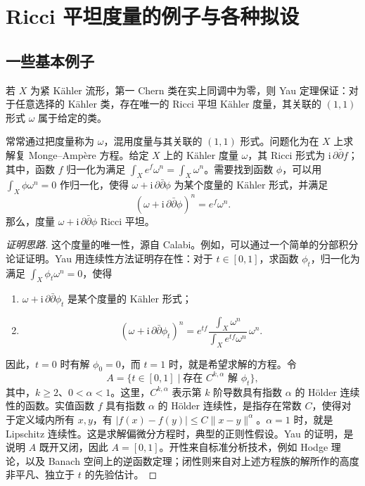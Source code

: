 \section{Ricci 平坦度量的例子与各种拟设}\label{sec:7.1}

\subsection{一些基本例子}\label{sec:7.1.1}

\begin{theorem*}[Yau 定理]
若 $X$ 为紧 Kähler 流形，第一 Chern 类在实上同调中为零，则 Yau 定理保证：对于任意选择的 Kähler 类，存在唯一的 Ricci 平坦 Kähler 度量，其关联的 $(1,1)$ 形式 $\omega$ 属于给定的类。
\end{theorem*}
常常通过把度量称为 $\omega$，混用度量与其关联的 $(1,1)$ 形式。问题化为在 $X$ 上求解复 Monge--Ampère 方程。给定 $X$ 上的 Kähler 度量 $\omega$，其 Ricci 形式为 $\mathrm i\,\partial\bar\partial f$；其中，函数 $f$ 归一化为满足 $\int_Xe^f\omega^n=\int_X\omega^n$。需要找到函数 $\phi$，可以用 $\int_X\phi\omega^n=0$ 作归一化，使得 $\omega+\mathrm i\,\partial\bar\partial\phi$ 为某个度量的 Kähler 形式，并满足
\[
(\omega+\mathrm i\,\partial\bar\partial\phi)^n=e^f\omega^n.
\]
那么，度量 $\omega+\mathrm i\,\partial\bar\partial\phi$ Ricci 平坦。

\begin{proof}[证明思路]
这个度量的唯一性，源自 Calabi。例如，可以通过一个简单的分部积分论证证明。Yau 用连续性方法证明存在性：对于 $t\in[0,1]$，求函数 $\phi_t$，归一化为满足 $\int_X\phi_t\omega^n=0$，使得
\begin{enumerate}[label=(\arabic*)]
\item $\omega+\mathrm i\,\partial\bar\partial\phi_t$ 是某个度量的 Kähler 形式；
\item
\[
(\omega+\mathrm i\,\partial\bar\partial\phi_t)^n
=e^{tf}\frac{\int_X\omega^n}{\int_Xe^{tf}\omega^n}\,\omega^n.
\]
\end{enumerate}

因此，$t=0$ 时有解 $\phi_0=0$，而 $t=1$ 时，就是希望求解的方程。令
\[
A=\{t\in[0,1]\mid\text{存在 }C^{k,\alpha}\text{ 解 }\phi_t\},
\]
其中，$k\geq2$、$0<\alpha<1$。这里，$C^{k,\alpha}$ 表示第 $k$ 阶导数具有指数 $\alpha$ 的 Hölder 连续性的函数。实值函数 $f$ 具有指数 $\alpha$ 的 Hölder 连续性，是指存在常数 $C$，使得对于定义域内所有 $x,y$，有 $|f(x)-f(y)|\leq C\|x-y\|^\alpha$。$\alpha=1$ 时，就是 Lipschitz 连续性。这是求解偏微分方程时，典型的正则性假设。Yau 的证明，是说明 $A$ 既开又闭，因此 $A=[0,1]$。开性来自标准分析技术，例如 Hodge 理论，以及 Banach 空间上的逆函数定理；闭性则来自对上述方程族的解所作的高度非平凡、独立于 $t$ 的先验估计。
\end{proof}

